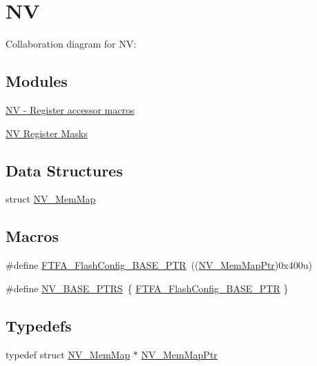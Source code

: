 \hypertarget{group___n_v___peripheral}{}\section{NV}
\label{group___n_v___peripheral}
Collaboration diagram for NV\+:
\subsection*{Modules}
\begin{DoxyCompactItemize}
\item 
\hyperlink{group___n_v___register___accessor___macros}{N\+V -\/ Register accessor macros}
\item 
\hyperlink{group___n_v___register___masks}{N\+V Register Masks}
\end{DoxyCompactItemize}
\subsection*{Data Structures}
\begin{DoxyCompactItemize}
\item 
struct \hyperlink{struct_n_v___mem_map}{N\+V\+\_\+\+Mem\+Map}
\end{DoxyCompactItemize}
\subsection*{Macros}
\begin{DoxyCompactItemize}
\item 
\#define \hyperlink{group___n_v___peripheral_ga3458652dfc38239f92682556e63596b5}{F\+T\+F\+A\+\_\+\+Flash\+Config\+\_\+\+B\+A\+S\+E\+\_\+\+P\+TR}~((\hyperlink{group___n_v___peripheral_ga9aac431b01e6b976f2f4e32409ab725f}{N\+V\+\_\+\+Mem\+Map\+Ptr})0x400u)
\item 
\#define \hyperlink{group___n_v___peripheral_ga1e44e66a8945b675dcebb6fbd6bdc85b}{N\+V\+\_\+\+B\+A\+S\+E\+\_\+\+P\+T\+RS}~\{ \hyperlink{group___n_v___peripheral_ga3458652dfc38239f92682556e63596b5}{F\+T\+F\+A\+\_\+\+Flash\+Config\+\_\+\+B\+A\+S\+E\+\_\+\+P\+TR} \}
\end{DoxyCompactItemize}
\subsection*{Typedefs}
\begin{DoxyCompactItemize}
\item 
typedef struct \hyperlink{struct_n_v___mem_map}{N\+V\+\_\+\+Mem\+Map} $\ast$ \hyperlink{group___n_v___peripheral_ga9aac431b01e6b976f2f4e32409ab725f}{N\+V\+\_\+\+Mem\+Map\+Ptr}
\end{DoxyCompactItemize}


